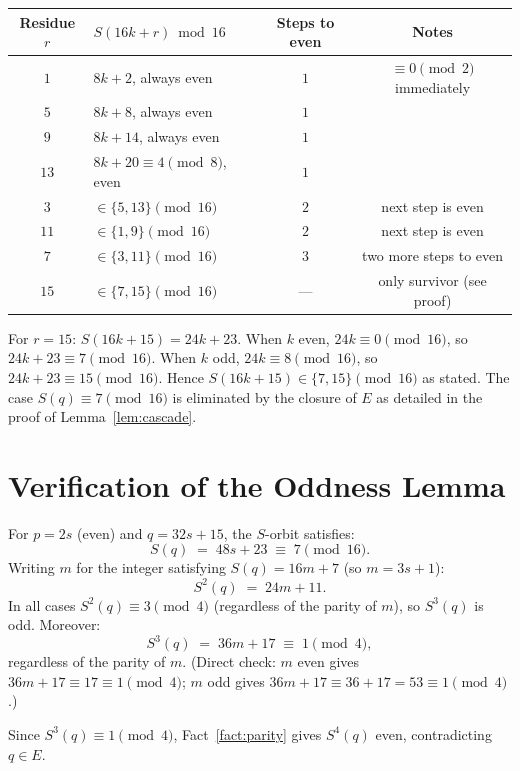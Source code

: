 \documentclass{amsart}
\theoremstyle{definition}
\theoremstyle{remark}
\begin{document}
\medskip
\begin{center}
\begin{tabular}{@{}clcc@{}}
\toprule
Residue $r$ & $S(16k+r)\bmod 16$ & Steps to even & Notes \\
\midrule
$1$  & $8k+2$, always even              & $1$ & $\equiv 0\pmod{2}$ immediately \\
$5$  & $8k+8$, always even              & $1$ & \\
$9$  & $8k+14$, always even             & $1$ & \\
$13$ & $8k+20\equiv 4\pmod{8}$, even    & $1$ & \\
$3$  & $\in\{5,13\}\pmod{16}$           & $2$ & next step is even \\
$11$ & $\in\{1,9\}\pmod{16}$            & $2$ & next step is even \\
$7$  & $\in\{3,11\}\pmod{16}$           & $3$ & two more steps to even \\
$15$ & $\in\{7,15\}\pmod{16}$           & --- & only survivor (see proof) \\
\bottomrule
\end{tabular}
\end{center}

\medskip
\noindent
For $r=15$: $S(16k+15)=24k+23$.
When $k$ even, $24k\equiv 0\pmod{16}$, so $24k+23\equiv 7\pmod{16}$.
When $k$ odd, $24k\equiv 8\pmod{16}$, so $24k+23\equiv 15\pmod{16}$.
Hence $S(16k+15)\in\{7,15\}\pmod{16}$ as stated.
The case $S(q)\equiv 7\pmod{16}$ is eliminated by the closure of $E$ as
detailed in the proof of Lemma~\ref{lem:cascade}.

\section{Verification of the Oddness Lemma}
\label{app:oddness}

For $p=2s$ (even) and $q=32s+15$, the $S$-orbit satisfies:
\[
  S(q) \;=\; 48s+23 \;\equiv\; 7\pmod{16}.
\]
Writing $m$ for the integer satisfying $S(q)=16m+7$ (so $m=3s+1$):
\[
  S^2(q) \;=\; 24m+11.
\]
In all cases $S^2(q)\equiv 3\pmod{4}$ (regardless of the parity of $m$),
so $S^3(q)$ is odd.
Moreover:
\[
  S^3(q) \;=\; 36m+17 \;\equiv\; 1\pmod{4},
\]
regardless of the parity of $m$.
(Direct check: $m$ even gives $36m+17\equiv 17\equiv 1\pmod{4}$;
$m$ odd gives $36m+17\equiv 36+17=53\equiv 1\pmod{4}$.)

Since $S^3(q)\equiv 1\pmod{4}$, Fact~\ref{fact:parity} gives $S^4(q)$
even, contradicting $q\in E$.
\end{document}
